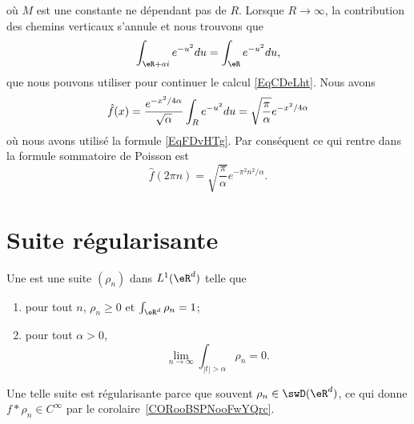 \begin{example}
	où \( M\) est une constante ne dépendant pas de \( R\). Lorsque \( R\to \infty\), la contribution des chemins verticaux s'annule et nous trouvons que
	\begin{equation}    \label{EqjrNxLr}
		\int_{\eR+ai} e^{-u^2}du=\int_{\eR} e^{-u^2}du,
	\end{equation}
	que nous pouvons utiliser pour continuer le calcul \eqref{EqCDeLht}. Nous avons
	\begin{equation}
		\hat f(x)= \frac{ e^{-x^2/4\alpha}}{\sqrt{\alpha}}\int_{R} e^{-u^2}du\\
		=\sqrt{\frac{ \pi }{ \alpha }} e^{-x^2/4\alpha}
	\end{equation}
	où nous avons utilisé la formule \eqref{EqFDvHTg}. Par conséquent ce qui rentre dans la formule sommatoire de Poisson est
	\begin{equation}
		\hat f(2\pi n)=\sqrt{\frac{ \pi }{ \alpha }} e^{-\pi^2 n^2/\alpha}.
	\end{equation}
\end{example}

\section{Suite régularisante}

\begin{definition}      \label{DEFooRIFYooUUUoha}
	Une  est une suite \( (\rho_n)\) dans \( L^1(\eR^d)\) telle que
	\begin{enumerate}
		\item       \label{ITEMooEYXYooAkKeXX}
		      pour tout \( n\), \( \rho_n\geq 0\) et \( \int_{\eR^d}\rho_n=1\);
		\item
		      pour tout \( \alpha>0\),
		      \begin{equation}
			      \lim_{n\to \infty} \int_{| t |>\alpha}\rho_n=0.
		      \end{equation}
	\end{enumerate}
\end{definition}
Une telle suite est régularisante parce que souvent \( \rho_n\in\swD(\eR^d)\), ce qui donne \( f*\rho_n\in C^{\infty}\) par le corolaire~\ref{CORooBSPNooFwYQrc}.

